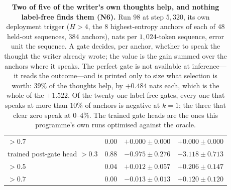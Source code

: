 \documentclass{article} %
\begin{document}
\begin{table}[t]
\begin{tabular}{lccc}
\quad $>0.7$ & 0.00 & $+0.000 \pm 0.000$ & $+0.000 \pm 0.000$ \\
trained post-gate head $>0.3$ & 0.88 & $-0.975 \pm 0.276$ & $-3.118 \pm 0.713$ \\
\quad $>0.5$ & 0.04 & $+0.012 \pm 0.057$ & $+0.206 \pm 0.147$ \\
\quad $>0.7$ & 0.00 & $-0.013 \pm 0.013$ & $+0.120 \pm 0.120$ \\
\bottomrule
\end{tabular}
\caption{\textbf{Two of five of the writer's own thoughts help, and nothing label-free finds them (N6).}
Run 98 at step $5{,}320$, its own deployment trigger ($H>4$, the $8$ highest-entropy anchors of each of $48$
held-out sequences, $384$ anchors), nats per $1{,}024$-token sequence, error unit the sequence. A gate decides,
per anchor, whether to speak the thought the writer already wrote; the value is the gain summed over the
anchors where it speaks. The perfect gate is not available at inference---it reads the outcome---and is
printed only to size what selection is worth: $39\%$ of the thoughts help, by $+0.484$ nats each, which is
the whole of the $+1.522$. Of the twenty-one label-free gates, every one that speaks at more than $10\%$ of
anchors is negative at $k{=}1$; the three that clear zero speak at $0$--$4\%$. The trained gate heads are the
ones this programme's own runs optimised against the oracle.}
\label{tab:gates}
\end{table}
\end{document}
